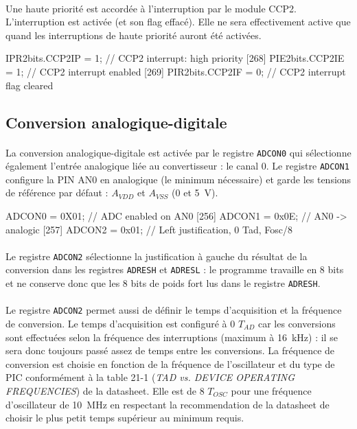 \documentclass{article}
\begin{document}
    \paragraph{}
    Une haute priorité est accordée à l'interruption par le module CCP2. L'interruption est activée (et son flag effacé). Elle ne sera effectivement active que quand les interruptions de haute priorité auront été activées.
    \begin{verbatimtab}
    [267]    IPR2bits.CCP2IP = 1;    // CCP2 interrupt: high priority
    [268]    PIE2bits.CCP2IE = 1;    // CCP2 interrupt enabled
    [269]    PIR2bits.CCP2IF = 0;    // CCP2 interrupt flag cleared
    \end{verbatimtab}

    \subsection{Conversion analogique-digitale}
    \paragraph{}
    La conversion analogique-digitale est activée par le registre \texttt{ADCON0} qui sélectionne également l'entrée analogique liée au convertisseur : le canal 0. Le registre \texttt{ADCON1} configure la PIN AN0 en analogique (le minimum nécessaire) et garde les tensions de référence par défaut : $A_{VDD}$ et $A_{VSS}$ (0 et \SI{5}{\volt}).
    \begin{verbatimtab}
    [255]    ADCON0  = 0X01;         // ADC enabled on AN0
    [256]    ADCON1  = 0x0E;         // AN0 -> analogic
    [257]    ADCON2  = 0x01;         // Left justification, 0 Tad, Fosc/8
    \end{verbatimtab}

    \paragraph{}
    Le registre \texttt{ADCON2} sélectionne la justification à gauche du résultat de la conversion dans les registres \texttt{ADRESH} et \texttt{ADRESL} : le programme travaille en 8 bits et ne conserve donc que les 8 bits de poids fort lus dans le registre \texttt{ADRESH}.

    \paragraph{}
    Le registre \texttt{ADCON2} permet aussi de définir le temps d'acquisition et la fréquence de conversion. Le temps d'acquisition est configuré à 0 $T_{AD}$ car les conversions sont effectuées selon la fréquence des interruptions (maximum à \SI{16}{\kilo\hertz}) : il se sera donc toujours passé assez de temps entre les conversions. La fréquence de conversion est choisie en fonction de la fréquence de l'oscillateur et du type de PIC conformément à la table 21-1 (\emph{TAD vs. DEVICE OPERATING FREQUENCIES}) de la datasheet. Elle est de 8 $T_{OSC}$ pour une fréquence d'oscillateur de \SI{10}{\mega\hertz} en respectant la recommendation de la datasheet de choisir le plus petit temps supérieur au minimum requis.
\end{document}
